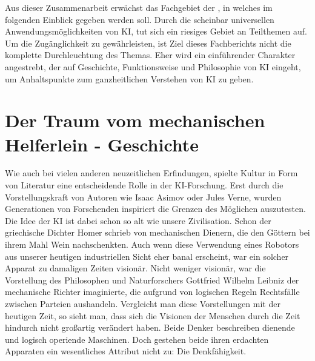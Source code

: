 \documentclass[12pt,german,ngerman]{report}
\begin{document}
    Aus dieser Zusammenarbeit erwächst das Fachgebiet der , in welches
    im folgenden Einblick gegeben werden soll.
    Durch die scheinbar universellen Anwendungsmöglichkeiten von KI, tut sich ein riesiges Gebiet an Teilthemen auf.
    Um die Zugänglichkeit zu gewährleisten, ist Ziel dieses Fachberichts nicht die komplette Durchleuchtung
    des Themas. Eher wird ein einführender Charakter angestrebt,
    der auf Geschichte, Funktionsweise und Philosophie von KI eingeht,
    um Anhaltspunkte zum ganzheitlichen Verstehen von KI zu geben.
    

\chapter{Der Traum vom mechanischen Helferlein - Geschichte}

    Wie auch bei vielen anderen neuzeitlichen Erfindungen, spielte Kultur in Form von Literatur eine entscheidende Rolle
    in der KI-Forschung. Erst durch die Vorstellungskraft von Autoren wie Isaac Asimov
    oder Jules Verne, 
    wurden Generationen von Forschenden inspiriert die Grenzen des Möglichen auszutesten. 
    Die Idee der KI ist dabei schon so alt wie unsere Zivilisation. 
    Schon der griechische Dichter Homer schrieb von mechanischen Dienern, die den Göttern bei ihrem Mahl
    Wein nachschenkten\cite[53]{buchanan2005very}. Auch wenn diese Verwendung eines Robotors aus unserer heutigen
    industriellen Sicht eher banal erscheint, war ein solcher Apparat zu damaligen Zeiten visionär.
    Nicht weniger visionär, war die Vorstellung des Philosophen und Naturforschers Gottfried Wilhelm Leibniz der mechanische
    Richter imaginierte, die aufgrund von logischen Regeln Rechtsfälle zwischen Parteien aushandeln\cite[53]{buchanan2005very}.
    Vergleicht man diese Vorstellungen mit der heutigen Zeit, so sieht man, dass sich die Visionen der Menschen durch die Zeit hindurch
    nicht großartig verändert haben. Beide Denker beschreiben dienende und logisch operiende Maschinen.
    Doch gestehen beide ihren erdachten Apparaten ein wesentliches Attribut nicht zu: Die Denkfähigkeit. 
\end{document}
